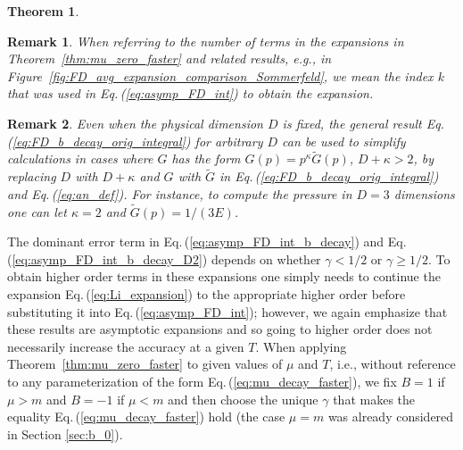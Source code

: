 \documentclass[sn-mathphys,Numbered]{sn-jnl}
\newcommand{\req}[1]{Eq.\,(\ref{#1})}
\newcommand{\rf}[1]{Figure~{\ref{#1}}}
\newcommand*{\xred}{\color{black}}
\newtheorem{theorem}{Theorem}
\newcommand{\rTh}[1]{Theorem~{\ref{#1}}}
\newtheorem{remark}{Remark}
\begin{document}
\begin{theorem}

\end{theorem}
\begin{remark}
 When referring to the number of terms in the expansions in \rTh{thm:mu_zero_faster} and related results, e.g., in \rf{fig:FD_avg_expansion_comparison_Sommerfeld}, we mean the index $k$ that was used in \req{eq:asymp_FD_int} to obtain the expansion.
\end{remark}
{\xred\begin{remark}
Even when the physical dimension $D$ is  fixed, the general result \req{eq:FD_b_decay_orig_integral} for arbitrary $D$ can be used to simplify calculations in cases where $G$ has the form $G(p)=p^\kappa \widetilde G(p)$, $D+\kappa>2$, by replacing $D$ with $D+\kappa$ and $G$ with $\widetilde G$ in \req{eq:FD_b_decay_orig_integral} and \req{eq:an_def}. For instance, to compute the pressure in $D=3$ dimensions one can let $\kappa=2$ and $\widetilde{G}(p)= 1 / (3 E) $.
\end{remark}}


The dominant error term in \req{eq:asymp_FD_int_b_decay} and \req{eq:asymp_FD_int_b_decay_D2} depends on whether $\gamma<1/2$ or $\gamma\geq 1/2$. To obtain higher order terms in these expansions one simply needs to continue the expansion \req{eq:Li_expansion} to the appropriate higher order before substituting it into \req{eq:asymp_FD_int}; however, we again emphasize that these results are asymptotic expansions and so going to higher order does not necessarily increase the accuracy at a given $T$. When applying \rTh{thm:mu_zero_faster} to given values of $\mu$ and $T$, i.e., without reference to any parameterization of the form \req{eq:mu_decay_faster}, we fix $B=1$ if $\mu>m$ and $B=-1$ if $\mu<m$ and then choose the unique $\gamma$ that makes the equality \req{eq:mu_decay_faster} hold (the case $\mu=m$ was already considered in Section \ref{sec:b_0}). 
\end{document}
